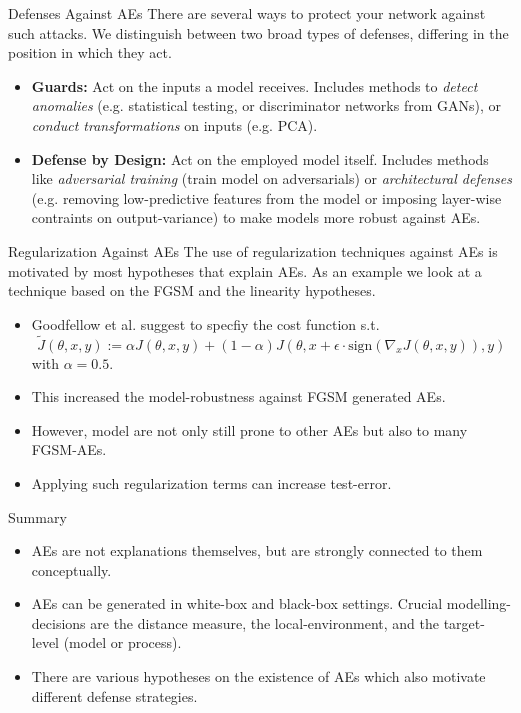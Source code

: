 \documentclass[11pt,compress,t,notes=noshow, xcolor=table]{beamer}
\begin{document}
\begin{vbframe}{Defenses Against AEs}
There are several ways to protect your network against such attacks. We distinguish between two broad types of defenses, differing in the position in which they act.
\begin{itemize}
    \item \textbf{Guards:} Act on the inputs a model receives. Includes methods to \emph{detect anomalies} (e.g. statistical testing, or discriminator networks from GANs), or \emph{conduct transformations} on inputs (e.g. PCA).
    \item \textbf{Defense by Design:} Act on the employed model itself. Includes methods like \emph{adversarial training} (train model on adversarials) or \emph{architectural defenses} (e.g. removing low-predictive features from the model or imposing layer-wise contraints on output-variance) to make models more robust against AEs.
\end{itemize}
\end{vbframe}

\begin{vbframe}{Regularization Against AEs}
The use of regularization techniques against AEs is motivated by most hypotheses that explain AEs. As an example we look at a technique based on the FGSM and the linearity hypotheses.
\begin{itemize}
    \item Goodfellow et al. suggest to specfiy the cost function s.t.
    \begin{equation*}
        \tilde{J}(\theta,x,y):=\alpha J(\theta,x,y)+(1-\alpha) J(\theta,x+\epsilon\cdot\text{sign}(\nabla_x J(\theta,x,y)),y)
    \end{equation*}
    with $\alpha=0.5$.
    \item This increased the model-robustness against FGSM generated AEs.
    \item However, model are not only still prone to other AEs but also to many FGSM-AEs.
    \item Applying such regularization terms can increase test-error.
\end{itemize}
\end{vbframe}

\begin{vbframe}{Summary}
\begin{itemize}
    \item AEs are not explanations themselves, but are strongly connected to them conceptually.
    \item AEs can be generated in white-box and black-box settings. Crucial modelling-decisions are the distance measure, the local-environment, and the target-level (model or process).
    \item There are various hypotheses on the existence of AEs which also motivate different defense strategies.
\end{itemize}
\end{vbframe}
\end{document}
